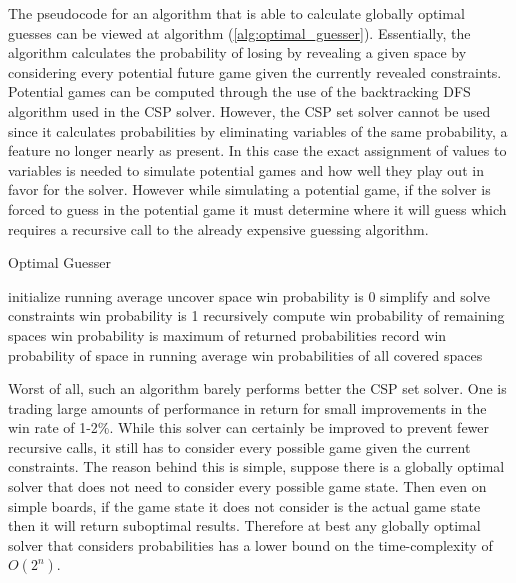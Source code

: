 \documentclass[letterpaper]{article}
\begin{document}
The pseudocode for an algorithm that is able to calculate globally optimal guesses can be viewed at algorithm (\ref{alg:optimal_guesser}).  Essentially, the algorithm calculates the probability of losing by revealing a given space by considering every potential future game given the currently revealed constraints.  Potential games can be computed through the use of the backtracking DFS algorithm used in the CSP solver.  However, the CSP set solver cannot be used since it calculates probabilities by eliminating variables of the same probability, a feature no longer nearly as present.  In this case the exact assignment of values to variables is needed to simulate potential games and how well they play out in favor for the solver.  However while simulating a potential game, if the solver is forced to guess in the potential game it must determine where it will guess which requires a recursive call to the already expensive guessing algorithm.

\begin{algorithm}[t]
\caption{Optimal Guesser}
\label{alg:optimal_guesser}
\begin{algorithmic}[1]
\STATE initialize running average 
		\STATE uncover space
			\STATE win probability is 0
		\ELSE
			\STATE simplify and solve constraints
				\STATE win probability is 1
			\ELSE
				\STATE recursively compute win probability of remaining spaces
				\STATE win probability is maximum of returned probabilities
			\ENDIF
		\ENDIF
	\ENDFOR
	\STATE record win probability of space in running average
\ENDFOR
\RETURN win probabilities of all covered spaces
\end{algorithmic}
\end{algorithm}

Worst of all, such an algorithm barely performs better the CSP set solver.  One is trading large amounts of performance in return for small improvements in the win rate of 1-2\%.  While this solver can certainly be improved to prevent fewer recursive calls, it still has to consider every possible game given the current constraints.  The reason behind this is simple, suppose there is a globally optimal solver that does not need to consider every possible game state.  Then even on simple boards, if the game state it does not consider is the actual game state then it will return suboptimal results.  Therefore at best any globally optimal solver that considers probabilities has a lower bound on the time-complexity of $O(2^n)$.
\end{document}
